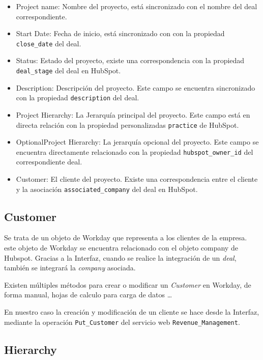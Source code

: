 \begin{itemize}
\item Project name: Nombre del proyecto, está sincronizado con el nombre del deal correspondiente.
\item Start Date: Fecha de inicio, está sincronizado con con la propiedad \verb|close_date| del deal.
\item Status: Estado del proyecto, existe una correspondencia con la propiedad \verb|deal_stage| del deal en HubSpot.
\item Description: Descripción del proyecto. Este campo se encuentra sincronizado con la propiedad \verb|description| del deal.

\item Project Hierarchy: La Jerarquía principal del proyecto. Este campo está en directa relación con la propiedad personalizadas
\verb|practice| de HubSpot.
\item OptionalProject Hierarchy: La jerarquía opcional del proyecto. Este campo se encuentra directamente relacionado con la propiedad \verb|hubspot_owner_id| del correspondiente deal.
\item Customer: El cliente del proyecto. Existe una correspondencia entre el cliente y la asociación \verb|associated_company| del deal en HubSpot.

\end{itemize}



\subsection{Customer}
Se trata de un objeto de Workday que representa a los clientes de la empresa. este objeto de Workday se encuentra relacionado con el objeto company de Hubspot. 
Gracias a la Interfaz, cuando se realice la integración de un \textit{deal}, también se integrará la \textit{company} asociada.

Existen múltiples métodos para crear o modificar un \textit{Customer} en Workday, de forma manual, hojas de calculo para carga de datos \ldots

En nuestro caso la creación y modificación de un cliente se hace desde la Interfaz, 
mediante la operación \verb|Put_Customer| del servicio web \verb|Revenue_Management|.

\subsection{Hierarchy}

